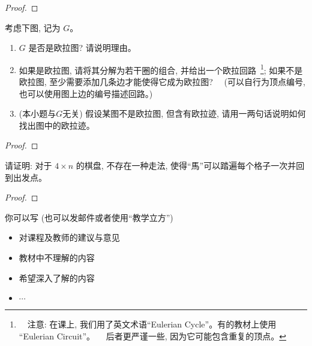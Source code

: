 \documentclass[a4paper, justified]{tufte-handout}
\begin{document}
\begin{proof}
\end{proof}

\begin{problem}[\score{4 = 1 + 2 + 1} $\star\star$]
  考虑下图, 记为 $G$。
  \begin{enumerate}[(1)]
    \item $G$ 是否是欧拉图? 请说明理由。
    \item 如果是欧拉图, 请将其分解为若干圈的组合, 并给出一个欧拉回路~\footnote{
    　注意: 在课上, 我们用了英文术语``Eulerian Cycle''。有的教材上使用 ``Eulerian Circuit''。
    　后者更严谨一些, 因为它可能包含重复的顶点。};
      如果不是欧拉图, 至少需要添加几条边才能使得它成为欧拉图?
    　(可以自行为顶点编号, 也可以使用图上边的编号描述回路。)
    \item (本小题与$G$无关) 假设某图不是欧拉图, 但含有欧拉迹,
      请用一两句话说明如何找出图中的欧拉迹。
  \end{enumerate}
\end{problem}

\begin{proof}
\end{proof}

\begin{problem}
  请证明: 对于 $4 \times n$ 的棋盘, 不存在一种走法,
  使得``馬''可以踏遍每个格子一次并回到出发点。
\end{problem}

\begin{proof}
\end{proof}


\begincorrection

\beginfb

你可以写 (也可以发邮件或者使用``教学立方'')
\begin{itemize}
  \item 对课程及教师的建议与意见
  \item 教材中不理解的内容
  \item 希望深入了解的内容
  \item $\cdots$
\end{itemize}
\end{document}
